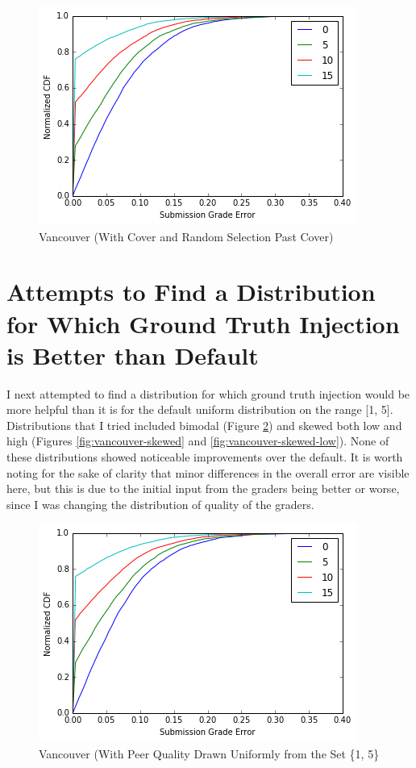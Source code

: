 \documentclass{article}
\begin{document}
	\begin{figure}[h]
		\includegraphics{vancouver-cover-random.png}
		\caption{Vancouver (With Cover and Random Selection Past Cover)}
		\label{fig:vancouver-cover-random}
	\end{figure}
	
	
	\section{Attempts to Find a Distribution for Which Ground Truth Injection is Better than Default}
	I next attempted to find a distribution for which ground truth injection would be more helpful than it is for the default uniform distribution on the range [1, 5]. Distributions that I tried included bimodal (Figure \ref{fig:vancouver-bimodal}) and skewed both low and high (Figures \ref{fig:vancouver-skewed} and \ref{fig:vancouver-skewed-low}). None of these distributions showed noticeable improvements over the default. It is worth noting for the sake of clarity that minor differences in the overall error are visible here, but this is due to the initial input from the graders being better or worse, since I was changing the distribution of quality of the graders.
	
	\begin{figure}[h]
		\includegraphics{vancouver-bimodal.png}
		\caption{Vancouver (With Peer Quality Drawn Uniformly from the Set \{1, 5\}}
		\label{fig:vancouver-bimodal}
	\end{figure}
	
\end{document}
